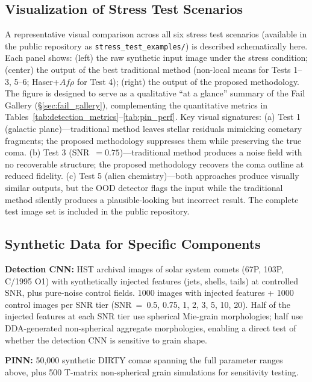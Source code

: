 \documentclass[usenatbib]{mnras}
\begin{document}
\subsection{Visualization of Stress Test Scenarios}

A representative visual comparison across all six stress test scenarios (available in the public repository as \texttt{stress\_test\_examples/}) is described schematically here. Each panel shows: (left) the raw synthetic input image under the stress condition; (center) the output of the best traditional method (non-local means for Tests 1--3, 5--6; Haser+$Af\rho$ for Test 4); (right) the output of the proposed methodology. The figure is designed to serve as a qualitative ``at a glance'' summary of the Fail Gallery (\S\ref{sec:fail_gallery}), complementing the quantitative metrics in Tables~\ref{tab:detection_metrics}--\ref{tab:pin_perf}. Key visual signatures: (a) Test 1 (galactic plane)---traditional method leaves stellar residuals mimicking cometary fragments; the proposed methodology suppresses them while preserving the true coma. (b) Test 3 (SNR~$=0.75$)---traditional method produces a noise field with no recoverable structure; the proposed methodology recovers the coma outline at reduced fidelity. (c) Test 5 (alien chemistry)---both approaches produce visually similar outputs, but the OOD detector flags the input while the traditional method silently produces a plausible-looking but incorrect result. The complete test image set is included in the public repository.

\subsection{Synthetic Data for Specific Components}

\textbf{Detection CNN:} HST archival images of solar system comets (67P, 103P, C/1995 O1) with synthetically injected features (jets, shells, tails) at controlled SNR, plus pure-noise control fields. 1000 images with injected features + 1000 control images per SNR tier (SNR~=~0.5, 0.75, 1, 2, 3, 5, 10, 20). Half of the injected features at each SNR tier use spherical Mie-grain morphologies; half use DDA-generated non-spherical aggregate morphologies, enabling a direct test of whether the detection CNN is sensitive to grain shape.

\textbf{PINN:} 50,000 synthetic DIRTY comae spanning the full parameter ranges above, plus 500 T-matrix non-spherical grain simulations for sensitivity testing.
\end{document}
